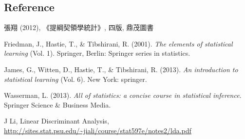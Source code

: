 \documentclass[12pt,a4paper]{article}%
\theoremstyle{definition}
\theoremstyle{plain}
\numberwithin{equation}{section}
\begin{document}
\begin{CJK}{UTF8}{cwmb}
\section*{Reference}
\noindent
\begin{description}\itemsep=-2pt
\item 張翔 (2012), 《提綱契領學統計》, 四版, 鼎茂圖書
\item Friedman, J., Hastie, T., \& Tibshirani, R. (2001). {\it{The elements of statistical learning}} (Vol. 1). Springer, Berlin: Springer series in statistics.
\item James, G., Witten, D., Hastie, T., \& Tibshirani, R. (2013). {\it{An introduction to statistical learning}} (Vol. 6). New York: springer.
\item Wasserman, L. (2013). {\it{All of statistics: a concise course in statistical inference}}. Springer Science \& Business Media.
\item J Li, Linear Discriminant Analysis, \url{http://sites.stat.psu.edu/~jiali/course/stat597e/notes2/lda.pdf}
\end{description}
\end{CJK}
\end{document}
